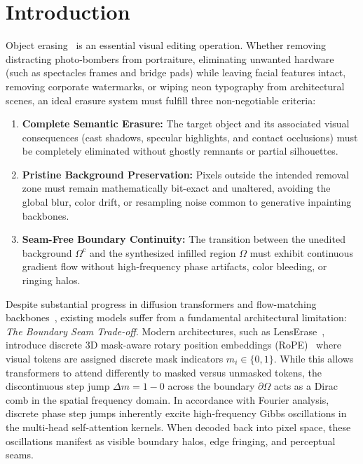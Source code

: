 \documentclass[11pt,a4paper]{article}
\begin{document}
\section{Introduction}
\label{sec:introduction}
Object erasing~\cite{lenserase2026,suvorov2022resolution,rombach2022high} is an essential visual editing operation. Whether removing distracting photo-bombers from portraiture, eliminating unwanted hardware (such as spectacles frames and bridge pads) while leaving facial features intact, removing corporate watermarks, or wiping neon typography from architectural scenes, an ideal erasure system must fulfill three non-negotiable criteria:
\begin{enumerate}[label=(\roman*)]
    \item \textbf{Complete Semantic Erasure:} The target object and its associated visual consequences (cast shadows, specular highlights, and contact occlusions) must be completely eliminated without ghostly remnants or partial silhouettes.
    \item \textbf{Pristine Background Preservation:} Pixels outside the intended removal zone must remain mathematically bit-exact and unaltered, avoiding the global blur, color drift, or resampling noise common to generative inpainting backbones.
    \item \textbf{Seam-Free Boundary Continuity:} The transition between the unedited background $\Omega^{\text{c}}$ and the synthesized infilled region $\Omega$ must exhibit continuous gradient flow without high-frequency phase artifacts, color bleeding, or ringing halos.
\end{enumerate}

Despite substantial progress in diffusion transformers and flow-matching backbones~\cite{lipman2022flow,rombach2022high}, existing models suffer from a fundamental architectural limitation: \textit{The Boundary Seam Trade-off}. Modern architectures, such as LensErase~\cite{lenserase2026}, introduce discrete 3D mask-aware rotary position embeddings (RoPE)~\cite{su2024roformer} where visual tokens are assigned discrete mask indicators $m_i \in \{0, 1\}$. While this allows transformers to attend differently to masked versus unmasked tokens, the discontinuous step jump $\Delta m = 1 - 0$ across the boundary $\partial \Omega$ acts as a Dirac comb in the spatial frequency domain. In accordance with Fourier analysis, discrete phase step jumps inherently excite high-frequency Gibbs oscillations in the multi-head self-attention kernels. When decoded back into pixel space, these oscillations manifest as visible boundary halos, edge fringing, and perceptual seams.
\end{document}

